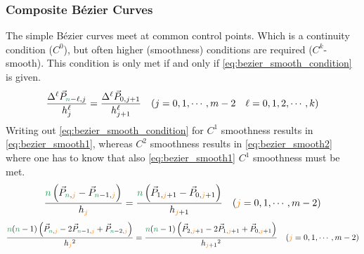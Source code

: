 \subsubsection{Composite Bézier Curves}
The simple Bézier curves meet at common control points. Which is a continuity condition ($C^0$), but often higher (smoothness) conditions are required ($C^k$-smooth). This condition is only met if and only if \autoref{eq:bezier_smooth_condition} is given.
\begin{equation} \label{eq:bezier_smooth_condition}
\frac{\Delta^{\ell} \vec{P}_{\textcolor{ForestGreen}{n}-\ell, j}}{h_j^{\ell}}=\frac{\Delta^{\ell} \vec{P}_{0, j+1}}{h_{j+1}^{\ell}} \quad(j=0,1, \cdots, m-2 \quad \ell=0,1,2, \cdots, k)
\end{equation}
Writing out \autoref{eq:bezier_smooth_condition} for $C^1$ smoothness results in \autoref{eq:bezier_smooth1}, whereas $C^2$ smoothness results in  \autoref{eq:bezier_smooth2} where one has to know that also \autoref{eq:bezier_smooth1} $C^1$ smoothness must be met.
\begin{equation}\label{eq:bezier_smooth1}
\frac{\textcolor{ForestGreen}{n}\left(\vec{P}_{\textcolor{ForestGreen}{n}, \textcolor{orange}{j}}-\vec{P}_{\textcolor{ForestGreen}{n}-1, \textcolor{orange}{j}}\right)}{h_{\textcolor{orange}{j}}}=\frac{\textcolor{ForestGreen}{n}\left(\vec{P}_{1, \textcolor{orange}{j}+1}-\vec{P}_{0, \textcolor{orange}{j}+1}\right)}{h_{\textcolor{orange}{j}+1}} \quad(\textcolor{orange}{j}=0,1, \cdots, m-2)
\end{equation}
\begin{equation}\label{eq:bezier_smooth2}
\frac{\textcolor{ForestGreen}{n}(\textcolor{ForestGreen}{n}-1)\left(\vec{P}_{\textcolor{ForestGreen}{n}, \textcolor{orange}{j}}-2 \vec{P}_{\textcolor{ForestGreen}{n}-1, \textcolor{orange}{j}}+\vec{P}_{\textcolor{ForestGreen}{n}-2, \textcolor{orange}{j}}\right)}{h_{\textcolor{orange}{j}}{ }^2}=\frac{\textcolor{ForestGreen}{n}(\textcolor{ForestGreen}{n}-1)\left(\vec{P}_{2, \textcolor{orange}{j}+1}-2 \vec{P}_{1, \textcolor{orange}{j}+1}+\vec{P}_{0, \textcolor{orange}{j}+1}\right)}{h_{\textcolor{orange}{j}+1}{ }^2} \quad(\textcolor{orange}{j}=0,1, \cdots, m-2)
\end{equation}

